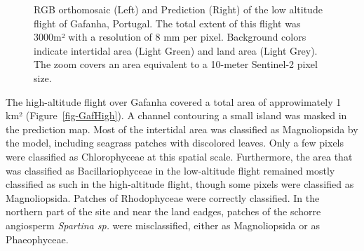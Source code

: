 \documentclass[
  number]{elsarticle}
\begin{document}
\label{cell-fig-GafLow}
\begin{figure}[H]


\caption{\label{fig-GafLow}RGB orthomosaic (Left) and Prediction (Right)
of the low altitude flight of Gafanha, Portugal. The total extent of
this flight was 3000m² with a resolution of 8 mm per pixel. Background
colors indicate intertidal area (Light Green) and land area (Light
Grey). The zoom covers an area equivalent to a 10-meter Sentinel-2 pixel
size.}

\end{figure}%

The high-altitude flight over Gafanha covered a total area of
approwimately 1 km² (Figure~\ref{fig-GafHigh}). A channel contouring a
small island was masked in the prediction map. Most of the intertidal
area was classified as Magnoliopsida by the model, including seagrass
patches with discolored leaves. Only a few pixels were classified as
Chlorophyceae at this spatial scale. Furthermore, the area that was
classified as Bacillariophyceae in the low-altitude flight remained
mostly classified as such in the high-altitude flight, though some
pixels were classified as Magnoliopsida. Patches of Rhodophyceae were
correctly classified. In the northern part of the site and near the land
eadges, patches of the schorre angiosperm \emph{Spartina sp.} were
misclassified, either as Magnoliopsida or as Phaeophyceae.
\end{document}
